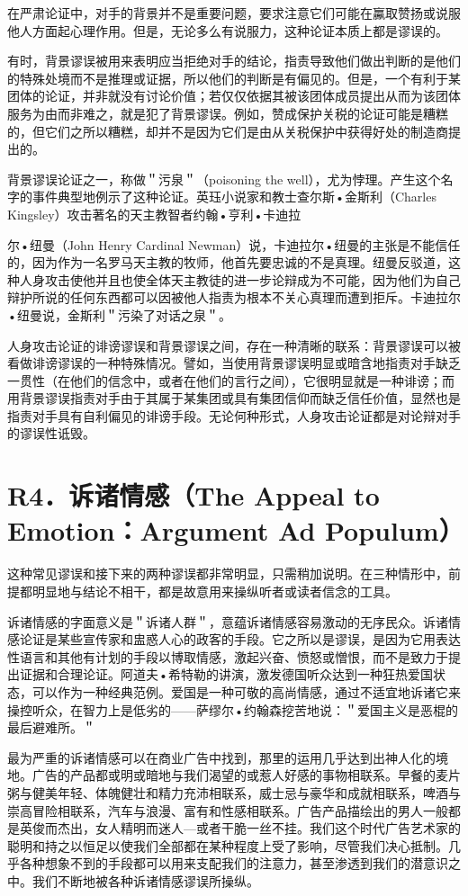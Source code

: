 在严肃论证中，对手的背景并不是重要问题，要求注意它们可能在鸁取赞扬或说服他人方面起心理作用。但是，无论多么有说服力，这种论证本质上都是谬误的。

有时，背景谬误被用来表明应当拒绝对手的结论，指责导致他们做出判断的是他们的特殊处境而不是推理或证据，所以他们的判断是有偏见的。但是，一个有利于某团体的论证，并非就没有讨论价值；若仅仅依据其被该团体成员提出从而为该团体服务为由而非难之，就是犯了背景谬误。例如，赞成保护关税的论证可能是糟糕的，但它们之所以糟糕，却并不是因为它们是由从关税保护中获得好处的制造商提出的。

背景谬误论证之一，称做＂污泉＂（poisoning the well），尤为悖理。产生这个名字的事件典型地例示了这种论证。英珏小说家和教士查尔斯•金斯利（Charles Kingsley）攻击著名的天主教智者约翰•亨利•卡迪拉

尔•纽曼（John Henry Cardinal Newman）说，卡迪拉尔•纽曼的主张是不能信任的，因为作为一名罗马天主教的牧师，他首先要忠诚的不是真理。纽曼反驳道，这种人身攻击使他并且也使全体天主教徒的进一步论辩成为不可能，因为他们为自己辩护所说的任何东西都可以因被他人指责为根本不关心真理而遭到拒斥。卡迪拉尔•纽曼说，金斯利＂污染了对话之泉＂。

人身攻击论证的诽谤谬误和背景谬误之间，存在一种清晰的联系：背景谬误可以被看做诽谤谬误的一种特殊情况。譬如，当使用背景谬误明显或暗含地指责对手缺乏一贯性（在他们的信念中，或者在他们的言行之间），它很明显就是一种诽谤；而用背景谬误指责对手由于其属于某集团或具有集团信仰而缺乏信任价值，显然也是指责对手具有自利偏见的诽谤手段。无论何种形式，人身攻击论证都是对论辩对手的谬误性诋毁。

\section*{R4．诉诸情感（The Appeal to Emotion：Argument Ad Populum）}
这种常见谬误和接下来的两种谬误都非常明显，只需稍加说明。在三种情形中，前提都明显地与结论不相干，都是故意用来操纵听者或读者信念的工具。

诉诸情感的字面意义是＂诉诸人群＂，意蕴诉诸情感容易激动的无序民众。诉诸情感论证是某些宣传家和盅惑人心的政客的手段。它之所以是谬误，是因为它用表达性语言和其他有计划的手段以博取情感，激起兴奋、愤怒或憎恨，而不是致力于提出证据和合理论证。阿道夫•希特勒的讲演，激发德国听众达到一种狂热爱国状态，可以作为一种经典范例。爱国是一种可敬的高尚情感，通过不适宜地诉诸它来操控听众，在智力上是低劣的——萨缪尔•约翰森挖苦地说：＂爱国主义是恶棍的最后避难所。＂

最为严重的诉诸情感可以在商业广告中找到，那里的运用几乎达到出神人化的境地。广告的产品都或明或暗地与我们渴望的或惹人好感的事物相联系。早餐的麦片粥与健美年轻、体魄健壮和精力充沛相联系，威士忌与豪华和成就相联系，啤酒与崇高冒险相联系，汽车与浪漫、富有和性感相联系。广告产品描绘出的男人一般都是英俊而杰出，女人精明而迷人—或者干脆一丝不挂。我们这个时代广告艺术家的聪明和持之以恒足以使我们全部都在某种程度上受了影响，尽管我们决心抵制。几乎各种想象不到的手段都可以用来支配我们的注意力，甚至渗透到我们的潜意识之中。我们不断地被各种诉诸情感谬误所操纵。

